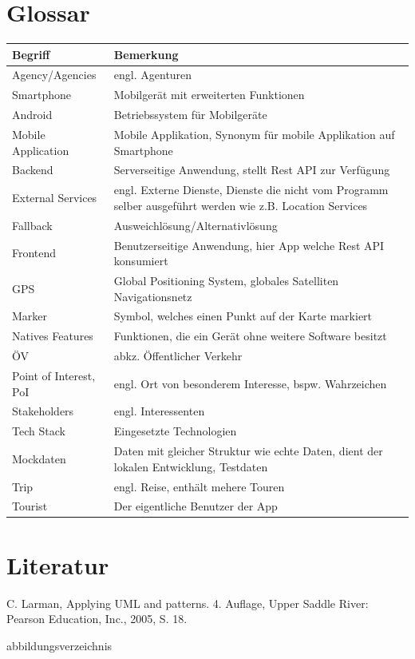 \documentclass[a4paper,10pt,xetex]{article}
\begin{document}
\section{Glossar}\label{glossar}
\begin{longtabu} to \textwidth { | l | X[l] | }
\hline
\textbf{Begriff} & \textbf{Bemerkung}\\\hline
\endhead

Agency/Agencies & engl. Agenturen\\\hline
Smartphone & Mobilgerät mit erweiterten Funktionen\\\hline
Android & Betriebssystem für Mobilgeräte\\\hline
Mobile Application & Mobile Applikation, Synonym für mobile Applikation auf Smartphone\\\hline
Backend & Serverseitige Anwendung, stellt Rest API zur Verfügung\\\hline
External Services & engl. Externe Dienste, Dienste die nicht vom Programm selber ausgeführt werden wie z.B. Location Services\\\hline
Fallback & Ausweichlösung/Alternativlösung\\\hline
Frontend & Benutzerseitige Anwendung, hier App welche Rest API konsumiert\\\hline
GPS & Global Positioning System, globales Satelliten Navigationsnetz\\\hline
Marker & Symbol, welches einen Punkt auf der Karte markiert\\\hline
Natives Features & Funktionen, die ein Gerät ohne weitere Software besitzt\\\hline
ÖV & abkz. Öffentlicher Verkehr\\\hline
Point of Interest, PoI & engl. Ort von besonderem Interesse, bspw. Wahrzeichen\\\hline
Stakeholders & engl. Interessenten\\\hline
Tech Stack & Eingesetzte Technologien\\\hline
Mockdaten & Daten mit gleicher Struktur wie echte Daten, dient der lokalen Entwicklung, Testdaten \\\hline
Trip & engl. Reise, enthält mehere Touren\\\hline
Tourist & Der eigentliche Benutzer der App\\\hline
\end{longtabu}


\section{Literatur}\label{literatur}
\begingroup
\renewcommand{\section}[2]{}%
  \begin{thebibliography}{9}
     C. Larman, Applying UML and patterns. 4. Auflage, Upper Saddle River: Pearson Education, Inc., 2005, S. 18.
  \end{thebibliography}
\endgroup

\section{Abbildungsverzeichnis}\label{abbildungsverzeichnis}
\begingroup
\renewcommand{\section}[2]{}%
\hypersetup{linkcolor=black}
\listoffigures
\endgroup
\end{document}
